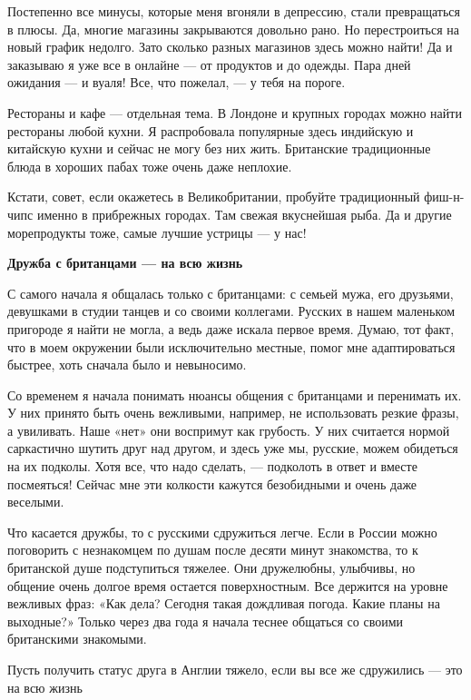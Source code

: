 Постепенно все минусы, которые меня вгоняли в депрессию, стали превращаться в плюсы. Да, многие магазины закрываются довольно рано. Но перестроиться на новый график недолго. Зато сколько разных магазинов здесь можно найти! Да и заказываю я уже все в онлайне — от продуктов и до одежды. Пара дней ожидания — и вуаля! Все, что пожелал, — у тебя на пороге.

Рестораны и кафе — отдельная тема. В Лондоне и крупных городах можно найти рестораны любой кухни. Я распробовала популярные здесь индийскую и китайскую кухни и сейчас не могу без них жить. Британские традиционные блюда в хороших пабах тоже очень даже неплохие.

\begin{fancyquotes}
    Кстати, совет, если окажетесь в Великобритании, пробуйте традиционный фиш-н-чипс именно в прибрежных городах. Там свежая вкуснейшая рыба. Да и другие морепродукты тоже, самые лучшие устрицы — у нас!
\end{fancyquotes}


\textbf{Дружба с британцами — на всю жизнь}

С самого начала я общалась только с британцами: с семьей мужа, его друзьями, девушками в студии танцев и со своими коллегами. Русских в нашем маленьком пригороде я найти не могла, а ведь даже искала первое время. Думаю, тот факт, что в моем окружении были исключительно местные, помог мне адаптироваться быстрее, хоть сначала было и невыносимо.

Со временем я начала понимать нюансы общения с британцами и перенимать их. У них принято быть очень вежливыми, например, не использовать резкие фразы, а увиливать. Наше «нет» они воспримут как грубость. У них считается нормой саркастично шутить друг над другом, и здесь уже мы, русские, можем обидеться на их подколы. Хотя все, что надо сделать, — подколоть в ответ и вместе посмеяться! Сейчас мне эти колкости кажутся безобидными и очень даже веселыми.

Что касается дружбы, то с русскими сдружиться легче. Если в России можно поговорить с незнакомцем по душам после десяти минут знакомства, то к британской душе подступиться тяжелее. Они дружелюбны, улыбчивы, но общение очень долгое время остается поверхностным. Все держится на уровне вежливых фраз: «Как дела? Сегодня такая дождливая погода. Какие планы на выходные?» Только через два года я начала теснее общаться со своими британскими знакомыми.

\begin{fancyquotes}
    Пусть получить статус друга в Англии тяжело, если вы все же сдружились — это на всю жизнь
\end{fancyquotes}

